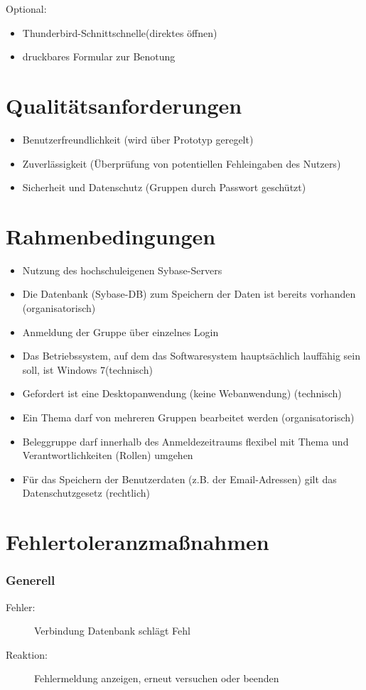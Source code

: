\documentclass{article}
\begin{document}
Optional:
\begin{itemize}
\item Thunderbird-Schnittschnelle(direktes öffnen)
\item druckbares Formular zur Benotung
\end{itemize}

\newpage
\part{Qualitätsanforderungen}
\begin{itemize}
\item Benutzerfreundlichkeit (wird über Prototyp geregelt)
\item Zuverlässigkeit (Überprüfung von potentiellen Fehleingaben des Nutzers)
\item Sicherheit und Datenschutz (Gruppen durch Passwort geschützt)
\end{itemize}

\newpage
\part{Rahmenbedingungen}
\begin{itemize}
\item Nutzung des hochschuleigenen Sybase-Servers
\item Die Datenbank (Sybase-DB) zum Speichern der Daten ist bereits vorhanden
(organisatorisch)
\item Anmeldung der Gruppe über einzelnes Login
\item Das Betriebssystem, auf dem das Softwaresystem hauptsächlich lauffähig
sein soll, ist Windows 7(technisch)
\item Gefordert ist eine Desktopanwendung (keine Webanwendung) (technisch)
\item Ein Thema darf von mehreren Gruppen bearbeitet werden (organisatorisch)
\item Beleggruppe darf innerhalb des Anmeldezeitraums flexibel mit Thema und Verantwortlichkeiten (Rollen) umgehen
\item Für das Speichern der Benutzerdaten (z.B. der Email-Adressen) gilt das
Datenschutzgesetz (rechtlich)
\end{itemize}

\newpage
\part{Fehlertoleranzmaßnahmen}

\section{Generell}
\begin{description}
\item[Fehler:] Verbindung Datenbank schlägt Fehl
\item[Reaktion:] Fehlermeldung anzeigen, erneut versuchen oder beenden
\end{description}
\end{document}
